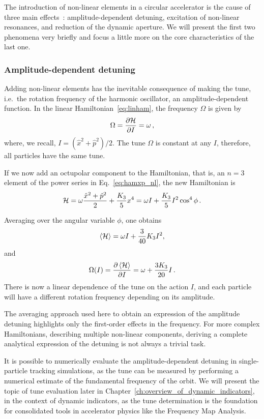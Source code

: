 The introduction of non-linear elements in a circular accelerator is the cause of three main effects~\cite{herr}: amplitude-dependent detuning, excitation of non-linear resonances, and reduction of the dynamic aperture. We will present the first two phenomena very briefly and focus a little more on the core characteristics of the last one.

\subsubsection{Amplitude-dependent detuning}

Adding non-linear elements has the inevitable consequence of making the tune, i.e.\ the rotation frequency of the harmonic oscillator, an amplitude-dependent function. In the linear Hamiltonian~\eqref{eq:linham}, the frequency $\Omega$ is given by
\begin{equation}
	\Omega = \pdv{\mathcal{H}}{I} = \omega\,,
\end{equation}
where, we recall, $I=(\hat x^2 + \hat p^2)/2$. The tune $\Omega$ is constant at any $I$, therefore, all particles have the same tune.

If we now add an octupolar component to the Hamiltonian, that is, an $n=3$ element of the power series in Eq.~\ref{eq:hamxp_nl}, the new Hamiltonian is
\begin{equation}
	\mathcal{H} = \omega \frac{\hat x^2 + \hat p^2}{2} + \frac{K_3}{5} x^4 = \omega I + \frac{K_3}{5} I^2 \cos^4\phi\, .
\end{equation}

Averaging over the angular variable $\phi$, one obtains
\begin{equation}
	\left<{\mathcal{H}}\right> = \omega I + \frac{3}{40}K_3 I^2,
\end{equation}
%
and
%
\begin{equation}
	\Omega(I) = \pdv{\left<{\mathcal{H}}\right>}{I} = \omega + \frac{3K_3}{20} I\,.
\end{equation}
There is now a linear dependence of the tune on the action $I$, and each particle will have a different rotation frequency depending on its amplitude.

The averaging approach used here to obtain an expression of the amplitude detuning highlights only the first-order effects in the frequency. For more complex Hamiltonians, describing multiple non-linear components, deriving a complete analytical expression of the detuning is not always a trivial task.

It is possible to numerically evaluate the amplitude-dependent detuning in single-particle tracking simulations, as the tune can be measured by performing a numerical estimate of the fundamental frequency of the orbit. We will present the topic of tune evaluation later in Chapter~\ref{ch:overview_of_dynamic_indicators}, in the context of dynamic indicators, as the tune determination is the foundation for consolidated tools in accelerator physics like the Frequency Map Analysis.

